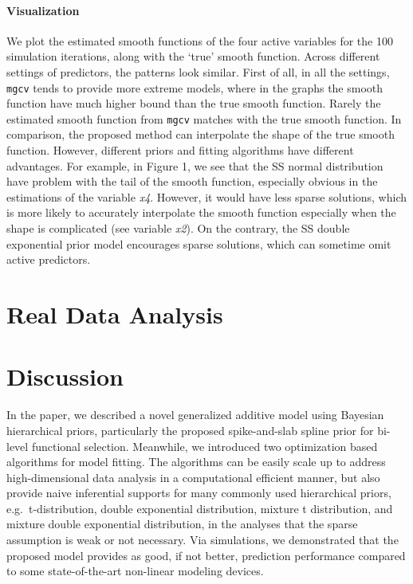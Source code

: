 \documentclass[AMA,STIX1COL,]{WileyNJD-v2}
\begin{document}
\hypertarget{visualization}{%
\paragraph{Visualization}\label{visualization}}

We plot the estimated smooth functions of the four active variables for
the 100 simulation iterations, along with the `true' smooth function.
Across different settings of predictors, the patterns look similar.
First of all, in all the settings, \texttt{mgcv} tends to provide more
extreme models, where in the graphs the smooth function have much higher
bound than the true smooth function. Rarely the estimated smooth
function from \texttt{mgcv} matches with the true smooth function. In
comparison, the proposed method can interpolate the shape of the true
smooth function. However, different priors and fitting algorithms have
different advantages. For example, in Figure 1, we see that the SS
normal distribution have problem with the tail of the smooth function,
especially obvious in the estimations of the variable \emph{x4}.
However, it would have less sparse solutions, which is more likely to
accurately interpolate the smooth function especially when the shape is
complicated (see variable \emph{x2}). On the contrary, the SS double
exponential prior model encourages sparse solutions, which can sometime
omit active predictors.

\hypertarget{real-data-analysis}{%
\section{Real Data Analysis}\label{real-data-analysis}}

\hypertarget{discussion}{%
\section{Discussion}\label{discussion}}

In the paper, we described a novel generalized additive model using
Bayesian hierarchical priors, particularly the proposed spike-and-slab
spline prior for bi-level functional selection. Meanwhile, we introduced
two optimization based algorithms for model fitting. The algorithms can
be easily scale up to address high-dimensional data analysis in a
computational efficient manner, but also provide naive inferential
supports for many commonly used hierarchical priors,
e.g.~t-distribution, double exponential distribution, mixture t
distribution, and mixture double exponential distribution, in the
analyses that the sparse assumption is weak or not necessary. Via
simulations, we demonstrated that the proposed model provides as good,
if not better, prediction performance compared to some state-of-the-art
non-linear modeling devices.
\end{document}
